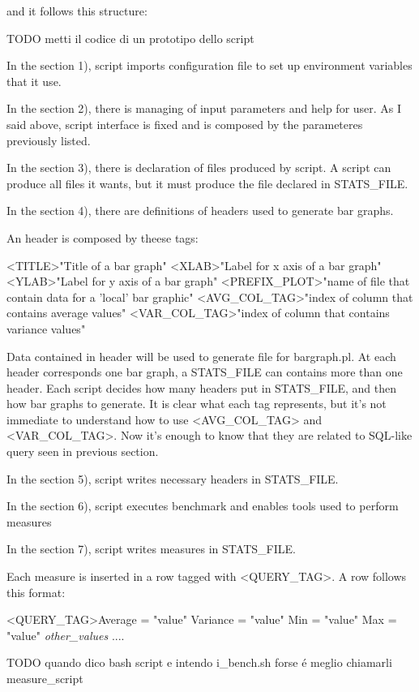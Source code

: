 \documentclass[a4paper,10pt]{article}
\begin{document}
\begin{multicols}{2}
and it follows this structure:

TODO metti il codice di un prototipo dello script

In the section 1), script imports configuration file to set up environment variables
that it use.

In the section 2), there is managing of input parameters and help for user.
As I said above, script interface is fixed and is composed by the parameteres previously
listed.

In the section 3), there is declaration of files produced by script.
A script can produce all files it wants, but it must produce the file declared in
STATS\_FILE.

In the section 4), there are definitions of headers used to generate bar graphs.

An header is composed by theese tags:

<TITLE>"Title of a bar graph"
<XLAB>"Label for x axis of a bar graph"
<YLAB>"Label for y axis of a bar graph"
<PREFIX\_PLOT>"name of file that contain data for a 'local' bar graphic"
<AVG\_COL\_TAG>"index of column that contains average values"
<VAR\_COL\_TAG>"index of column that contains variance values"

Data contained in header will be used to generate file for bargraph.pl. At each header corresponds one bar graph, a STATS\_FILE can
contains more than one header. Each script decides how many headers put in STATS\_FILE, and then how bar graphs to generate.
It is clear what each tag represents, but it's not immediate to understand how to use <AVG\_COL\_TAG> and <VAR\_COL\_TAG>. Now it's enough to know that
they are related to SQL-like query seen in previous section.

In the section 5), script writes necessary headers in STATS\_FILE.

In the section 6), script executes benchmark and enables tools used to perform measures

In the section 7), script writes measures in STATS\_FILE.

Each measure is inserted in a row tagged with <QUERY\_TAG>. A row follows this format:

<QUERY\_TAG>Average = "value" Variance = "value" Min = "value" Max = "value" \textit{other_values}
....

TODO quando dico bash script e intendo i\_bench.sh forse \'e meglio chiamarli measure_script


\end{multicols}
\end{document}
